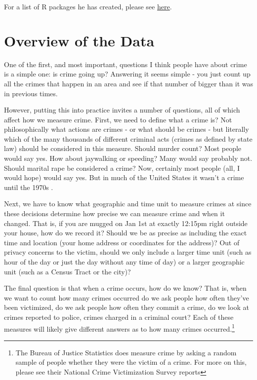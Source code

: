 \documentclass[
  12pt,
  openany]{book}
\begin{document}
For a list of R packages he has created, please see \href{https://jacobdkaplan.com/packages.html}{here}.

\hypertarget{ucr_general}{%
\chapter{Overview of the Data}\label{ucr_general}}

One of the first, and most important, questions I think people have about crime is a simple one: is crime going up? Answering it seems simple - you just count up all the crimes that happen in an area and see if that number of bigger than it was in previous times.

However, putting this into practice invites a number of questions, all of which affect how we measure crime. First, we need to define what a crime is? Not philosophically what actions are crimes - or what should be crimes - but literally which of the many thousands of different criminal acts (crimes as defined by state law) should be considered in this measure. Should murder count? Most people would say yes. How about jaywalking or speeding? Many would say probably not. Should marital rape be considered a crime? Now, certainly most people (all, I would hope) would say yes. But in much of the United States it wasn't a crime until the 1970s \citep{bennice2003marital, mcmahon2009criminalizing}.

Next, we have to know what geographic and time unit to measure crimes at since these decisions determine how precise we can measure crime and when it changed. That is, if you are mugged on Jan 1st at exactly 12:15pm right outside your house, how do we record it? Should we be as precise as including the exact time and location (your home address or coordinates for the address)? Out of privacy concerns to the victim, should we only include a larger time unit (such as hour of the day or just the day without any time of day) or a larger geographic unit (such as a Census Tract or the city)?

The final question is that when a crime occurs, how do we know? That is, when we want to count how many crimes occurred do we ask people how often they've been victimized, do we ask people how often they commit a crime, do we look at crimes reported to police, crimes charged in a criminal court? Each of these measures will likely give different answers as to how many crimes occurred.\footnote{The Bureau of Justice Statistics does measure crime by asking a random sample of people whether they were the victim of a crime. For more on this, please see their National Crime Victimization Survey reports}
\end{document}
